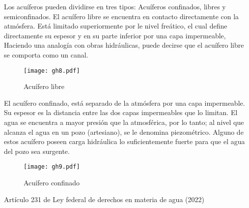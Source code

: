 Los acuíferos pueden dividirse en tres tipos: Acuíferos confinados, libres y semiconfinados. 
El acuífero libre se encuentra en contacto directamente con la atmósfera. Está limitado superiormente por le nivel freático, el cual define directamente su espesor y en su parte inferior por una capa impermeable, Haciendo una analogía con obras hidráulicas, puede decirse que el acuífero libre se comporta como un canal.
\begin{figure}[h!]
\centering
  \texttt{[image: gh8.pdf]}
  \caption{Acuífero libre}
  \label{gh8}
\end{figure}
El acuífero confinado, está separado de la atmósfera por una capa impermeable. Su espesor es la distancia entre las dos capas impermeables que lo limitan. El agua se encuentra a mayor presión que la atmosférica, por lo tanto; al nivel que alcanza el agua en un pozo (artesiano), se le denomina piezométrico. Alguno de estos acuífero poseen carga hidráulica lo suficientemente fuerte para que el agua del pozo sea surgente.
\begin{figure}[h!]
\centering
  \texttt{[image: gh9.pdf]}
  \caption{Acuífero confinado}
  \label{gh9}
\end{figure}
Artículo 231 de Ley federal de derechos en materia de agua (2022)

